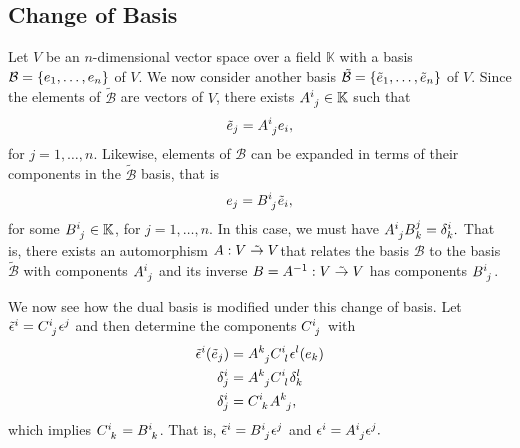 \subsection{Change of Basis}

Let \(V\) be an \(n\)-dimensional vector space over a field \(\mathbb{K}\) with a basis \(\mathcal{B} = \{e_1, \dots, e_n\}\) of \(V\). We now consider another basis \(\tilde{\mathcal{B}}=\{\tilde{e}_1, \dots, \tilde{e}_n\}\) of \(V\). Since the elements of \(\tilde{\mathcal{B}}\) are vectors of \(V\), there exists \(A\indices{^i_j} \in \mathbb{K}\) such that
\begin{equation*}
    \tilde{e}_j = A\indices{^i_j}e_i,
\end{equation*}
for \(j = 1, \dots, n\). Likewise, elements of \(\mathcal{B}\) can be expanded in terms of their components in the \(\tilde{\mathcal{B}}\) basis, that is
\begin{equation*}
    e_j = B\indices{^i_j}\tilde{e}_i,
\end{equation*}
for some \(B\indices{^i_j} \in \mathbb{K}\), for \(j = 1, \dots, n\). In this case, we must have \(A\indices{^i_j}B{^j_k} = \delta_{k}^{i}.\) That is, there exists an automorphism \(A : V \mathrel{\tilde{\to}} V\)that relates the basis \(\mathcal{B}\) to the basis \(\tilde{\mathcal{B}}\) with components \(A\indices{^i_j}\) and its inverse \(B = A^{-1} : V \mathrel{\tilde{\to}} V\) has components \(B\indices{^i_j}\).

We now see how the dual basis is modified under this change of basis. Let \(\tilde{\epsilon}^i = C\indices{^i_j}\epsilon^j\) and then determine the components \(C\indices{^i_j}\) with
\begin{align*}
    \tilde{\epsilon}^i(\tilde{e}_j) &= A\indices{^k_j}C\indices{^i_l}\epsilon^l(e_k)\\
    \delta^i_j &= A\indices{^k_j}C\indices{^i_l}\delta^l_k\\
    \delta^i_j &= C\indices{^i_k}A\indices{^k_j},
\end{align*}
which implies \(C\indices{^i_k} = B\indices{^i_k}\). That is, \(\tilde{\epsilon}^i = B\indices{^i_j}\epsilon^j\) and \(\epsilon^i = A\indices{^i_j}\epsilon^j.\)

